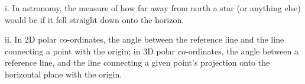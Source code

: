 i. In astronomy, the measure of how far away from north a star
(or anything else) would be if it fell straight down onto the horizon.
\par
ii. In 2D polar co-ordinates, the angle between the reference line
and the line connecting a point with the origin; in 3D polar
co-ordinates, the angle between a reference line, and the line
connecting a given point's projection onto the horizontal plane with
the origin.